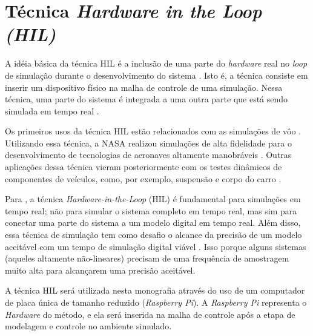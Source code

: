 \section{Técnica \textit{Hardware in the Loop (HIL)}}

A idéia básica da técnica HIL é a inclusão de 
uma parte do \textit{hardware} real no \textit{loop} de simulação durante o desenvolvimento 
do sistema \cite{Bacic}. Isto é, a técnica consiste em inserir um dispositivo físico 
na malha de controle de uma simulação. Nessa técnica, uma parte do sistema é integrada 
a uma outra parte que está sendo simulada em tempo real \cite{Abourida}.

Os primeiros usos da técnica HIL estão relacionados com 
as simulações de vôo \cite{Isermann}. Utilizando essa técnica, a NASA realizou simulações de alta 
fidelidade para o desenvolvimento de tecnologias de aeronaves altamente manobráveis \cite{Evans}. 
Outras aplicações dessa técnica vieram posteriormente com os testes dinâmicos de componentes 
de veículos, como, por exemplo, suspensão e corpo do carro \cite{Isermann}.

Para , a técnica \textit{Hardware-in-the-Loop} (HIL) é fundamental
para simulações em tempo real; não para simular o sistema completo em tempo real, mas sim
para conectar uma parte do sistema a um modelo digital em tempo real. Além disso, essa técnica
de simulação tem como desafio o alcance da precisão de um modelo aceitável com um tempo de simulação 
digital viável \cite{Abourida}. Isso porque alguns sistemas (aqueles altamente não-lineares)
precisam de uma frequência de amostragem muito alta para alcançarem uma precisão aceitável.

A técnica HIL será utilizada nesta monografia através do uso de um computador de placa única
de tamanho reduzido (\textit{Raspberry Pi}). A \textit{Raspberry Pi} representa o \textit{Hardware} 
do método, e ela será inserida na malha de controle após a etapa de modelagem e controle no 
ambiente simulado.

\clearpage